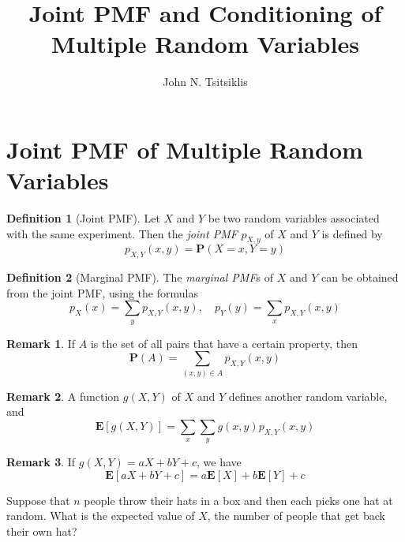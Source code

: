 \documentclass{tufte-handout}
\author{John N. Tsitsiklis}
\title{Joint PMF and Conditioning of Multiple Random Variables}
\theoremstyle{definition} \newtheorem{definition}{Definition}
\theoremstyle{definition} \newtheorem{remark}{Remark}
\newcommand{\prob}[1]{\mathbf{P} \left( #1 \right)}
\newcommand{\pmf}[2]{p_{#1} \left( #2 \right)}
\newcommand{\expt}[1]{\mathbf{E} \left[ #1 \right]}
\newcommand{\jpmf}[4]{p_{#1, #2} \left( #3, #4 \right)}
\begin{document}
\maketitle
\section{Joint PMF of Multiple Random Variables}
\begin{definition}[Joint PMF]
  Let $X$ and $Y$ be two random variables associated with the same
  experiment. Then the \emph{joint PMF} $p_{X, y}$ of $X$ and $Y$ is
  defined by
  \begin{equation*}
    \jpmf{X}{Y}{x}{y} = \prob{X = x, Y = y}
  \end{equation*}
\end{definition}

\begin{definition}[Marginal PMF]
  The \emph{marginal PMF}s of $X$ and $Y$ can be obtained from the joint
  PMF, using the formulas
  \begin{equation*}
    \pmf{X}{x} = \sum_y \jpmf{X}{Y}{x}{y}, \quad
    \pmf{Y}{y} = \sum_x \jpmf{X}{Y}{x}{y}
  \end{equation*}

\end{definition}

\begin{remark}
  If $A$ is the set of all pairs that have a certain property, then
  \begin{equation*}
      \prob{A} = \sum_{(x, y) \in A} \jpmf{X}{Y}{x}{y}
  \end{equation*}
\end{remark}

\begin{remark}
  A function $g(X, Y)$ of $X$ and $Y$ defines another random variable, and
  \begin{equation*}
    \expt{g(X, Y)} = \sum_x \sum_y g(x, y) \jpmf{X}{Y}{x}{y}
  \end{equation*}
\end{remark}

\begin{remark}
  If $g(X, Y) = aX + bY + c$, we have
  \begin{equation*}
    \expt{aX + bY + c} = a \expt{X} + b \expt{Y} + c
  \end{equation*}
\end{remark}

\begin{example}
  Suppose that $n$  people throw their hats in a box and then each picks
  one hat at random. What is the expected value of $X$, the number of
  people that get back their own hat?
\end{example}
\end{document}

